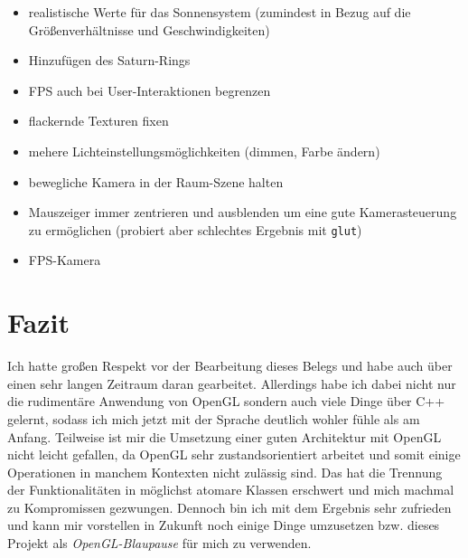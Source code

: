 \documentclass{article}
\let\oldsection\section
\renewcommand\section{\needspace{15\baselineskip}\oldsection}
\begin{document}
\begin{itemize}
    \item realistische Werte für das Sonnensystem (zumindest in Bezug auf die Größenverhältnisse und Geschwindigkeiten)
    \item Hinzufügen des Saturn-Rings
    \item FPS auch bei User-Interaktionen begrenzen
    \item flackernde Texturen fixen
    \item mehere Lichteinstellungsmöglichkeiten (dimmen, Farbe ändern)
    \item bewegliche Kamera in der Raum-Szene halten
    \item Mauszeiger immer zentrieren und ausblenden um eine gute Kamerasteuerung zu ermöglichen (probiert aber schlechtes Ergebnis mit \texttt{glut})
    \item FPS-Kamera
\end{itemize}


\section{Fazit}
Ich hatte großen Respekt vor der Bearbeitung dieses Belegs und habe auch über einen sehr langen Zeitraum daran gearbeitet.
Allerdings habe ich dabei nicht nur die rudimentäre Anwendung von OpenGL sondern auch viele Dinge über C++ gelernt, sodass ich mich jetzt mit der Sprache deutlich wohler fühle als am Anfang.
Teilweise ist mir die Umsetzung einer guten Architektur mit OpenGL nicht leicht gefallen, da OpenGL sehr zustandsorientiert arbeitet und somit einige Operationen in manchem Kontexten nicht zulässig sind.
Das hat die Trennung der Funktionalitäten in möglichst atomare Klassen erschwert und mich machmal zu Kompromissen gezwungen.
Dennoch bin ich mit dem Ergebnis sehr zufrieden und kann mir vorstellen in Zukunft noch einige Dinge umzusetzen bzw. dieses Projekt als \textit{OpenGL-Blaupause} für mich zu verwenden.

\clearpage

\begingroup
\end{document}
